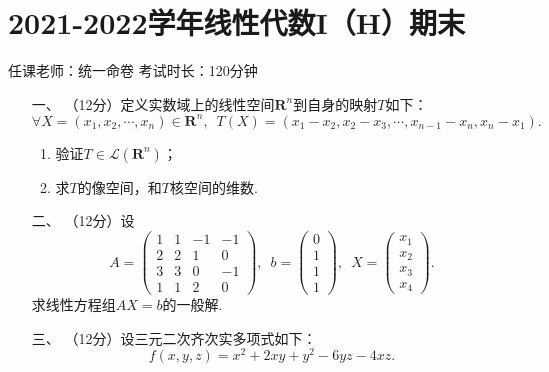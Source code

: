 \section*{2021-2022学年线性代数I（H）期末}

\begin{center}
    任课老师：统一命卷\hspace{4em} 考试时长：120分钟
\end{center}

\begin{enumerate}
	\item[一、]（12分）定义实数域上的线性空间$\mathbf{R}^n$到自身的映射$T$如下：
	\[\forall X=(x_1,x_2,\cdots,x_n)\in\mathbf{R}^n,\enspace T(X)=(x_1-x_2,x_2-x_3,\cdots,x_{n-1}-x_n,x_n-x_1).\]
    \begin{enumerate}[label=(\arabic*)]
        \item 验证$T\in\mathcal{L}(\mathbf{R}^n)$；
        \item 求$T$的像空间，和$T$核空间的维数.
    \end{enumerate}
	\item[二、]（12分）设
	\[A=\begin{pmatrix}
        1 & 1 & -1 & -1 \\ 2 & 2 & 1 & 0 \\ 3 & 3 & 0 & -1 \\ 1 & 1 & 2 & 0
    \end{pmatrix},\enspace b=\begin{pmatrix}
        0 \\ 1 \\ 1 \\ 1
    \end{pmatrix},\enspace X=\begin{pmatrix}
        x_1 \\ x_2 \\ x_3 \\ x_4
    \end{pmatrix}.\]
    求线性方程组$AX=b$的一般解.
	\item[三、]（12分）设三元二次齐次实多项式如下：
	\[f(x,y,z)=x^2+2xy+y^2-6yz-4xz.\]
\end{enumerate}
